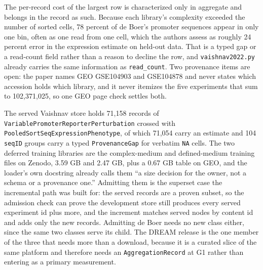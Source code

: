 The per-record cost of the largest row is characterized only in aggregate and belongs in the
record as such. Because each library's complexity exceeded the number of sorted cells, 78
percent of de Boer's promoter sequences appear in only one bin, often as one read from one
cell, which the authors assess as roughly 24 percent error in the expression estimate on
held-out data. That is a typed gap or a read-count field rather than a reason to decline the
row, and \texttt{vaishnav2022.py} already carries the same information as \texttt{read\_count}.
Two provenance items are open: the paper names GEO GSE104903 and GSE104878 and never states
which accession holds which library, and it never itemizes the five experiments that sum to
102,371,025, so one GEO page check settles both.

 The served
Vaishnav store holds 71,158 records of \texttt{VariablePromoterReporterPerturbation} crossed
with \texttt{PooledSortSeqExpressionPhenotype}, of which 71,054 carry an estimate and 104
\texttt{seqID} groups carry a typed \texttt{ProvenanceGap} for verbatim \texttt{NA} cells. The
two deferred training libraries are the complex-medium and defined-medium training files on
Zenodo, 3.59 GB and 2.47 GB, plus a 0.67 GB table on GEO,
and the loader's own docstring already calls them ``a size decision for the owner,
not a schema or a provenance one.'' Admitting them is the superset case the incremental path
was built for: the served records are a proven subset, so the admission check can prove the
development store still produces every served experiment id plus more, and the increment
matches served nodes by content id and adds only the new records. Admitting de Boer needs no
new class either, since the same two classes serve its child. The DREAM release is the one
member of the three that needs more than a download, because it is a curated slice of the same
platform and therefore needs an \texttt{AggregationRecord} at G1 rather than entering as a
primary measurement.

